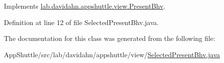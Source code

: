 \-Implements \hyperlink{classlab_1_1davidahn_1_1appshuttle_1_1view_1_1_present_bhv_ac0e40ea3b6d9e7f048815ac850edc9c7}{lab.\-davidahn.\-appshuttle.\-view.\-Present\-Bhv}.



\-Definition at line 12 of file \-Selected\-Present\-Bhv.\-java.



\-The documentation for this class was generated from the following file\-:\begin{DoxyCompactItemize}
\item 
\-App\-Shuttle/src/lab/davidahn/appshuttle/view/\hyperlink{_selected_present_bhv_8java}{\-Selected\-Present\-Bhv.\-java}\end{DoxyCompactItemize}
